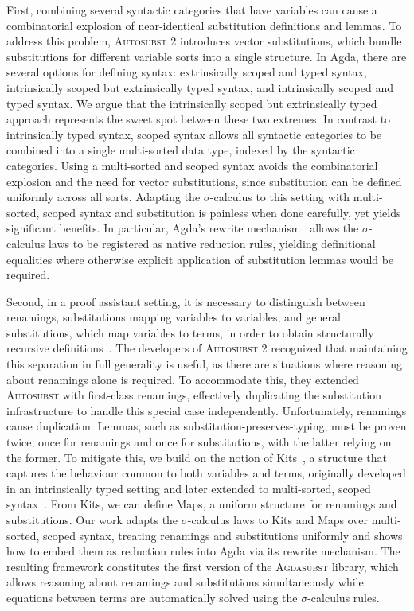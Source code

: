 \documentclass[screen,nonacm]{acmart}
\begin{document}
First, combining several syntactic categories that have variables can cause a
combinatorial explosion of near-identical substitution definitions and lemmas.
To address this problem, \textsc{Autosubst 2} introduces vector substitutions,
which bundle substitutions for different variable sorts into a single
structure. In Agda, there are several options for defining syntax:
extrinsically scoped and typed syntax, intrinsically scoped but extrinsically
typed syntax, and intrinsically scoped and typed syntax. We argue that the
intrinsically scoped but extrinsically typed approach represents the sweet spot
between these two extremes. In contrast to intrinsically typed syntax, scoped
syntax allows all syntactic categories to be combined into a single
multi-sorted data type, indexed by the syntactic categories. Using a
multi-sorted and scoped syntax avoids the combinatorial explosion and the need
for vector substitutions, since substitution can be defined uniformly across
all sorts. Adapting the $σ$-calculus to this setting with multi-sorted, scoped
syntax and substitution is painless when done carefully, yet yields significant
benefits. In particular, Agda’s rewrite mechanism~\cite{10.1145/3434341} allows
the $σ$-calculus laws to be registered as native reduction rules, yielding
definitional equalities where otherwise explicit application of substitution
lemmas would be required.

Second, in a proof assistant setting, it is necessary to distinguish between
renamings, substitutions mapping variables to variables, and general
substitutions, which map variables to terms, in order to obtain structurally
recursive definitions~\cite{10.1007/11617990_1}. The developers of
\textsc{Autosubst 2} recognized that maintaining this separation in full
generality is useful, as there are situations where reasoning about renamings
alone is required. To accommodate this, they extended \textsc{Autosubst} with
first-class renamings, effectively duplicating the substitution infrastructure
to handle this special case independently. Unfortunately, renamings cause
duplication. Lemmas, such as substitution-preserves-typing, must be proven
twice, once for renamings and once for substitutions, with the latter relying
on the former. To mitigate this, we build on the notion of Kits~\cite{ren-sub},
a structure that captures the behaviour common to both variables and terms,
originally developed in an intrinsically typed setting and later extended to
multi-sorted, scoped syntax~\cite{saffrich:LIPIcs.ITP.2024.32}. From Kits, we
can define Maps, a uniform structure for renamings and substitutions. Our work
adapts the $σ$-calculus laws to Kits and Maps over multi-sorted, scoped syntax,
treating renamings and substitutions uniformly and shows how to embed them as
reduction rules into Agda via its rewrite mechanism. The resulting framework
constitutes the first version of the \textsc{Agdasubst} library, which allows
reasoning about renamings and substitutions simultaneously while equations
between terms are automatically solved using the $σ$-calculus rules.
\end{document}
